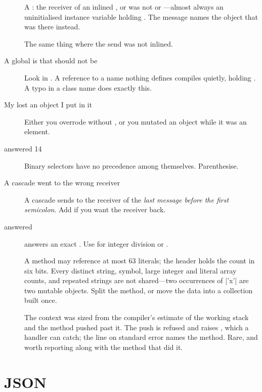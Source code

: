 \begin{description}
\item[] A
  : the receiver of an inlined ,
   or  was not  or ---almost always
  an uninitialised instance variable holding . The message names the
  object that was there instead.
\item[] The same thing where the send was
  not inlined.
\item[A global is  that should not be] Look in . A
  reference to a name nothing defines compiles quietly, holding . A
  typo in a class name does exactly this.
\item[My  lost an object I put in it] Either you overrode \ct{=}
  without , or you mutated an object while it was an element.
\item[ answered 14] Binary selectors have no precedence among
  themselves. Parenthesise.
\item[A cascade went to the wrong receiver] A cascade sends to the receiver of
  the \emph{last message before the first semicolon}. Add  if you
  want the receiver back.
\item[ answered ] \ct{/} answers an exact
  . Use \ct{//} for integer division or .
\item[] A method may reference at most
  63 literals; the header holds the count in six bits. Every distinct string,
  symbol, large integer and literal array counts, and repeated strings are not
  shared---two occurrences of \ct|'x'| are two mutable objects. Split the
  method, or move the data into a collection built once.
\item[] The context was sized from the
  compiler's estimate of the working stack and the method pushed past it.
  The push is refused and raises , which a handler can
  catch; the line on standard error names the method. Rare, and worth
  reporting along with the method that did it.
\end{description}

\section{JSON}

